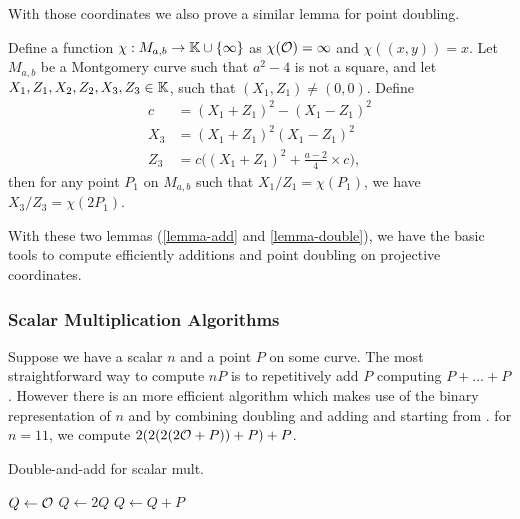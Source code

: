 With those coordinates we also prove a similar lemma for point doubling.
\begin{lemma}
\label{lemma-double}
Define a function $\chi : M_{a,b} \to \mathbb{K} \cup \{\infty\}$ as $\chi(\mathcal{O}) = \infty$ and $\chi((x,y)) = x$. Let $M_{a,b}$ be a Montgomery curve such that $a^2-4$ is not a square, and let $X_1, Z_1, X_2, Z_2, X_3, Z_3 \in \mathbb{K}$, such that $(X_1,Z_1) \neq (0,0)$. Define
\begin{align*}
  c &= (X_1 + Z_1)^2 - (X_1 - Z_1)^2\\
X_3 &= (X_1 + Z_1)^2(X_1-Z_1)^2\\
Z_3 &= c\Big((X_1 + Z_1)^2+\frac{a-2}{4}\times c\Big),
\end{align*}
then for any point $P_1$ on $M_{a,b}$ such that $X_1/Z_1 = \chi(P_1)$, we have $X_3/Z_3 = \chi(2P_1)$.
\end{lemma}

With these two lemmas (\ref{lemma-add} and \ref{lemma-double}), we have the basic tools to compute efficiently additions and point doubling on projective coordinates.

\subsubsection{Scalar Multiplication Algorithms}
\label{ladder}

Suppose we have a scalar $n$ and a point $P$ on some curve. The most straightforward way to compute $nP$ is to repetitively add $P$ \ie computing $P + \ldots + P$.
However there is an more efficient algorithm which makes use of the binary representation of $n$ and by combining doubling and adding and starting from  \Oinf.
\eg for $n=11$, we compute $2(2(2(2\mathcal{O} + P)) + P)+ P$.

\begin{algorithm}[H]
\caption{Double-and-add for scalar mult.}
\label{double-add}
\begin{algorithmic}
\STATE $Q \leftarrow \mathcal{O}$
  \STATE $Q \leftarrow 2Q$
    \STATE $Q \leftarrow Q + P$
  \ENDIF
\ENDFOR
\end{algorithmic}
\end{algorithm}

